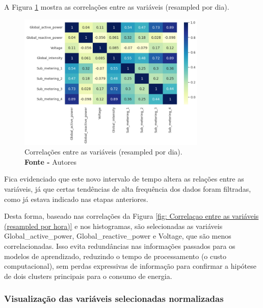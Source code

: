 A Figura \ref{fig: Correlação entre as variáveis (resampled por dia)} mostra as correlações entre as variáveis (resampled por dia).
\begin{figure}[H]
    \centering
    \includegraphics[width=0.80\textwidth]{Figuras/4. Resultados e Discussões/Exer4/Correlação entre as variáveis (resampled por dia).jpg}
    \caption{Correlações entre as variáveis (resampled por dia).\\ \textbf{Fonte -} Autores}
    \label{fig: Correlação entre as variáveis (resampled por dia)}
\end{figure}

Fica evidenciado que este novo intervalo de tempo altera as relações entre as variáveis, já que certas tendências de alta frequência dos dados foram filtradas, como já estava indicado nas etapas anteriores.

Desta forma, baseado nas correlações da Figura \ref{fig: Correlaçao entre as variáveis (resampled por hora)} e nos histogramas, são selecionadas as variáveis Global\_active\_power, Global\_reactive\_power e Voltage, que são menos correlacionadas. Isso evita redundâncias nas informações passados para os modelos de aprendizado, reduzindo o tempo de processamento (o custo computacional), sem perdas expressivas de informação para confirmar a hipótese de dois clusters principais para o consumo de energia.

\subsubsection{Visualização das variáveis selecionadas normalizadas}

